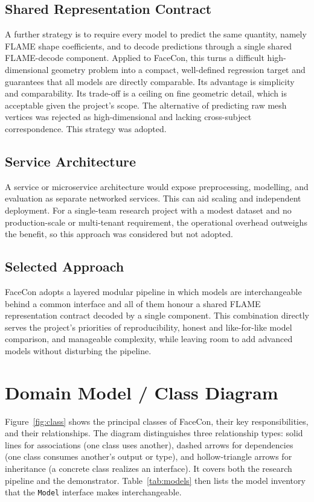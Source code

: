 \subsection{Shared Representation Contract}
A further strategy is to require every model to predict the same quantity, namely FLAME shape coefficients, and to decode predictions through a single shared FLAME-decode component. Applied to FaceCon, this turns a difficult high-dimensional geometry problem into a compact, well-defined regression target and guarantees that all models are directly comparable. Its advantage is simplicity and comparability. Its trade-off is a ceiling on fine geometric detail, which is acceptable given the project's scope. The alternative of predicting raw mesh vertices was rejected as high-dimensional and lacking cross-subject correspondence. This strategy was adopted.

\subsection{Service Architecture}
A service or microservice architecture would expose preprocessing, modelling, and evaluation as separate networked services. This can aid scaling and independent deployment. For a single-team research project with a modest dataset and no production-scale or multi-tenant requirement, the operational overhead outweighs the benefit, so this approach was considered but not adopted.

\subsection{Selected Approach}
FaceCon adopts a layered modular pipeline in which models are interchangeable behind a common interface and all of them honour a shared FLAME representation contract decoded by a single component. This combination directly serves the project's priorities of reproducibility, honest and like-for-like model comparison, and manageable complexity, while leaving room to add advanced models without disturbing the pipeline.

\section{Domain Model / Class Diagram}
Figure~\ref{fig:class} shows the principal classes of FaceCon, their key responsibilities, and their relationships. The diagram distinguishes three relationship types: solid lines for associations (one class uses another), dashed arrows for dependencies (one class consumes another's output or type), and hollow-triangle arrows for inheritance (a concrete class realizes an interface). It covers both the research pipeline and the demonstrator. Table~\ref{tab:models} then lists the model inventory that the \texttt{Model} interface makes interchangeable.

